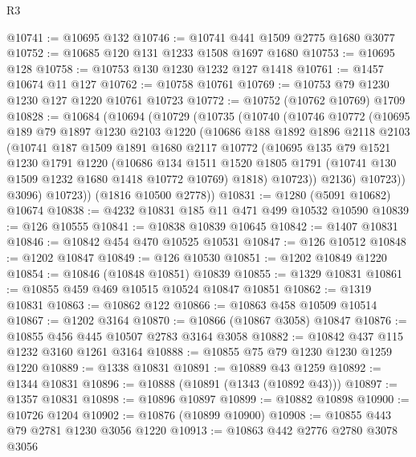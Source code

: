 \begin{lexlean}{R3}
\begin{coremodule}
@10741 := @10695 @132
@10746 := @10741 @441 @1509 @2775 @1680 @3077
@10752 := @10685 @120 @131 @1233 @1508 @1697 @1680
@10753 := @10695 @128
@10758 := @10753 @130 @1230 @1232 @127 @1418
@10761 := @1457 @10674 @11 @127
@10762 := @10758 @10761
@10769 := @10753 @79 @1230 @1230 @127 @1220 @10761 @10723
@10772 := @10752 (@10762 @10769) @1709
@10828 := @10684
    (@10694
      (@10729
        (@10735
          (@10740
            (@10746
              @10772
              (@10695
                @189
                @79
                @1897
                @1230
                @2103
                @1220
                (@10686
                  @188
                  @1892
                  @1896
                  @2118
                  @2103
                  (@10741
                    @187
                    @1509
                    @1891
                    @1680
                    @2117
                    @10772
                    (@10695
                      @135
                      @79
                      @1521
                      @1230
                      @1791
                      @1220
                      (@10686
                        @134
                        @1511
                        @1520
                        @1805
                        @1791
                        (@10741 @130 @1509 @1232 @1680 @1418 @10772 @10769)
                        @1818)
                      @10723))
                  @2136)
                @10723))
            @3096)
          @10723))
      (@1816 @10500 @2778))
@10831 := @1280 (@5091 @10682) @10674
@10838 := @4232 @10831 @185 @11 @471 @499 @10532 @10590
@10839 := @126 @10555
@10841 := @10838 @10839 @10645
@10842 := @1407 @10831
@10846 := @10842 @454 @470 @10525 @10531
@10847 := @126 @10512
@10848 := @1202 @10847
@10849 := @126 @10530
@10851 := @1202 @10849 @1220
@10854 := @10846 (@10848 @10851) @10839
@10855 := @1329 @10831
@10861 := @10855 @459 @469 @10515 @10524 @10847 @10851
@10862 := @1319 @10831
@10863 := @10862 @122
@10866 := @10863 @458 @10509 @10514
@10867 := @1202 @3164
@10870 := @10866 (@10867 @3058) @10847
@10876 := @10855 @456 @445 @10507 @2783 @3164 @3058
@10882 := @10842 @437 @115 @1232 @3160 @1261 @3164
@10888 := @10855 @75 @79 @1230 @1230 @1259 @1220
@10889 := @1338 @10831
@10891 := @10889 @43 @1259
@10892 := @1344 @10831
@10896 := @10888 (@10891 (@1343 (@10892 @43)))
@10897 := @1357 @10831
@10898 := @10896 @10897
@10899 := @10882 @10898
@10900 := @10726 @1204
@10902 := @10876 (@10899 @10900)
@10908 := @10855 @443 @79 @2781 @1230 @3056 @1220
@10913 := @10863 @442 @2776 @2780 @3078 @3056

\end{coremodule}
\end{lexlean}
